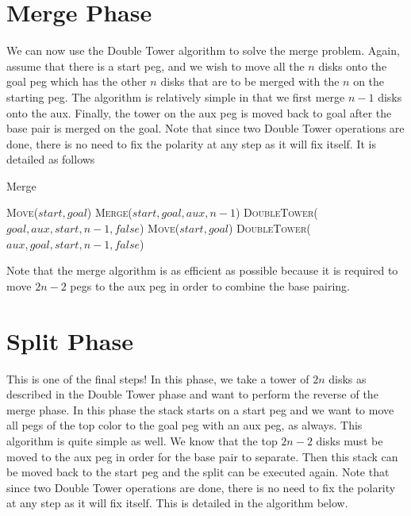 \documentclass[fontsize = 10pt]{scrartcl}
\begin{document}
\section{Merge Phase}
We can now use the Double Tower algorithm to solve the merge problem. Again, assume that there is a start peg, and we wish to move all the $n$ disks onto the goal peg which has the other $n$ disks that are to be merged with the $n$ on the starting peg. The algorithm is relatively simple in that we first merge $n-1$ disks onto the aux. Finally, the tower on the aux peg is moved back to goal after the base pair is merged on the goal. Note that since two Double Tower operations are done, there is no need to fix the polarity at any step as it will fix itself. It is detailed as follows

\begin{algorithm}[H]
\caption{Merge}
\begin{algorithmic}[1]
\State \textsc{Move}($start, goal$)
\Else
\State \textsc{Merge}($start, goal, aux, n-1$)
\State \textsc{DoubleTower}($goal, aux, start, n-1, false$)
\State \textsc{Move}($start, goal$)
\State \textsc{DoubleTower}($aux, goal, start, n-1, false$)
\EndIf
\EndProcedure
\end{algorithmic}
\end{algorithm}
Note that the merge algorithm is as efficient as possible because it is required to move $2n - 2$ pegs to the aux peg in order to combine the base pairing.

\section{Split Phase}
This is one of the final steps! In this phase, we take a tower of $2n$ disks as described in the Double Tower phase and want to perform the reverse of the merge phase. In this phase the stack starts on a start peg and we want to move all pegs of the top color to the goal peg with an aux peg, as always. This algorithm is quite simple as well. We know that the top $2n-2$ disks must be moved to the aux peg in order for the base pair to separate. Then this stack can be moved back to the start peg and the split can be executed again. Note that since two Double Tower operations are done, there is no need to fix the polarity at any step as it will fix itself. This is detailed in the algorithm below.
\end{document}
